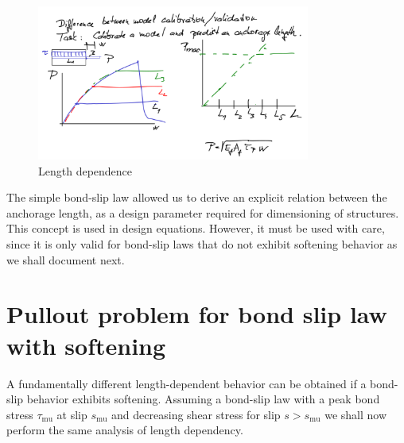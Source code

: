 \documentclass[main.tex]{subfiles}
\begin{document}
\begin{figure}[ht]
	\centering
  \includegraphics[width=0.8\textwidth]{drawings/lecture04-fig-plasticity-length-dependence.pdf}
	\caption{Length dependence}
	\label{fig_length_dependence}
\end{figure}
The simple bond-slip law allowed us to derive an explicit relation between the anchorage length, as a design parameter required for dimensioning of structures. This concept is  used in design equations. However, it must be used with care, since it is only valid for bond-slip laws that do not exhibit softening behavior as we shall document next.




%

\section{Pullout problem for bond slip law with softening}
\label{SEC:bond_slip_softening}

A fundamentally different length-dependent behavior can be obtained if a bond-slip behavior exhibits softening. Assuming a bond-slip law with a peak bond stress $\tau_{\mathrm{mu}}$ at slip $s_{\mathrm{mu}}$ and decreasing shear stress for slip $s > s_{\mathrm{mu}}$ we shall now perform the same analysis of length dependency.
\end{document}
